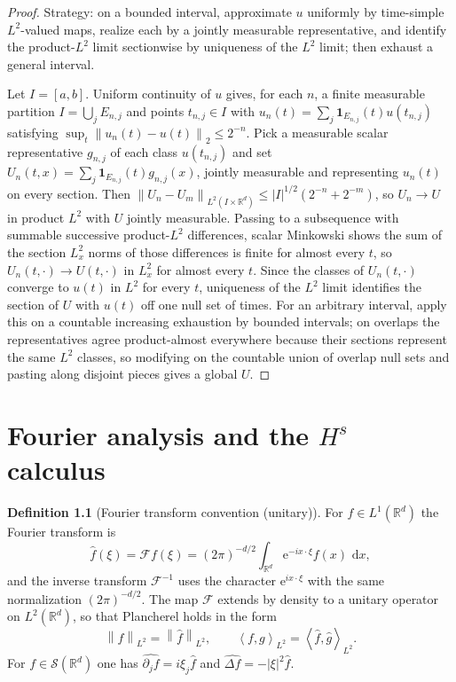 \documentclass[11pt,oneside]{book}
\providecommand{\uses}[1]{}
\theoremstyle{definition}
\newtheorem{definition}[theorem]{Definition}
\theoremstyle{remark}
\newcommand{\R}{\mathbb R}
\newcommand{\Ssch}{\mathcal S}
\newcommand{\1}{\mathbf 1}
\newcommand{\dd}{\,\mathrm d}
\newcommand{\norm}[1]{\left\lVert #1\right\rVert}
\newcommand{\abs}[1]{\left\lvert #1\right\rvert}
\newcommand{\pair}[2]{\left\langle #1,#2\right\rangle}
\newcommand{\FT}{\mathcal F}
\newcommand{\e}{\mathrm e}
\begin{document}
\begin{proof}
\uses{conv:joint-representatives, def:scalar-mixed-norm}
Strategy: on a bounded interval, approximate $u$ uniformly by time-simple $L^2$-valued maps, realize each by a jointly measurable representative, and identify the product-$L^2$ limit sectionwise by uniqueness of the $L^2$ limit; then exhaust a general interval.

Let $I=[a,b]$. Uniform continuity of $u$ gives, for each $n$, a finite measurable partition $I=\bigcup_j E_{n,j}$ and points $t_{n,j}\in I$ with $u_n(t)=\sum_j\1_{E_{n,j}}(t)u(t_{n,j})$ satisfying $\sup_t\norm{u_n(t)-u(t)}_2\le2^{-n}$. Pick a measurable scalar representative $g_{n,j}$ of each class $u(t_{n,j})$ and set $U_n(t,x)=\sum_j\1_{E_{n,j}}(t)g_{n,j}(x)$, jointly measurable and representing $u_n(t)$ on every section. Then $\norm{U_n-U_m}_{L^2(I\times\R^d)}\le\abs{I}^{1/2}(2^{-n}+2^{-m})$, so $U_n\to U$ in product $L^2$ with $U$ jointly measurable. Passing to a subsequence with summable successive product-$L^2$ differences, scalar Minkowski shows the sum of the section $L^2_x$ norms of those differences is finite for almost every $t$, so $U_n(t,\cdot)\to U(t,\cdot)$ in $L^2_x$ for almost every $t$. Since the classes of $U_n(t,\cdot)$ converge to $u(t)$ in $L^2$ for every $t$, uniqueness of the $L^2$ limit identifies the section of $U$ with $u(t)$ off one null set of times. For an arbitrary interval, apply this on a countable increasing exhaustion by bounded intervals; on overlaps the representatives agree product-almost everywhere because their sections represent the same $L^2$ classes, so modifying on the countable union of overlap null sets and pasting along disjoint pieces gives a global $U$.
\end{proof}


\chapter{Fourier analysis and the $H^{s}$ calculus}\label{chap:fourier}

\begin{definition}[Fourier transform convention (unitary)]\label{def:fourier-convention}
For $f\in L^1(\R^d)$ the Fourier transform is
\begin{equation}
 \widehat f(\xi)=\FT f(\xi)=(2\pi)^{-d/2}\int_{\R^d}\e^{-ix\cdot\xi}f(x)\,\dd x,
 \label{eq:FT-convention}
\end{equation}
and the inverse transform $\FT^{-1}$ uses the character $\e^{ix\cdot\xi}$ with
the same normalization $(2\pi)^{-d/2}$. The map $\FT$ extends by density to a
unitary operator on $L^2(\R^d)$, so that Plancherel holds in the form
\[
 \norm{f}_{L^2}=\norm{\widehat f}_{L^2},
 \qquad
 \pair{f}{g}_{L^2}=\pair{\widehat f}{\widehat g}_{L^2}.
\]
For $f\in\Ssch(\R^d)$ one has $\widehat{\partial_jf}=i\xi_j\widehat f$ and
$\widehat{\Delta f}=-\abs{\xi}^2\widehat f$.
\end{definition}
\end{document}
